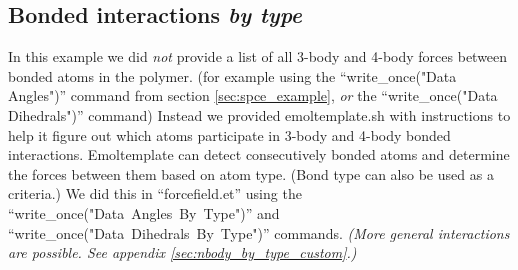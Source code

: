 \documentclass[11pt]{article}
\begin{document}


\subsection{Bonded interactions \textit{by type}}
\label{sec:nbody_by_type_intro}

In this example we did \textit{not} provide a list of all 3-body
and 4-body forces between bonded atoms in the polymer.
(for example using the ``write\_once("Data Angles")'' command
from section \ref{sec:spce_example},
\textit{or} 
the ``write\_once("Data Dihedrals")'' command)
Instead we provided emoltemplate.sh with instructions to help it figure out 
which atoms participate in 3-body and 4-body bonded interactions.
Emoltemplate can detect consecutively bonded atoms and 
determine the forces between them based on atom type.
(Bond type can also be used as a criteria.)
We did this in ``forcefield.et'' using the
\mbox{``write\_once("Data Angles By Type")''} and 
\mbox{``write\_once("Data Dihedrals By Type")''} 
commands.
\textit{(More general interactions are possible.
 See appendix \ref{sec:nbody_by_type_custom}.)}
\end{document}
